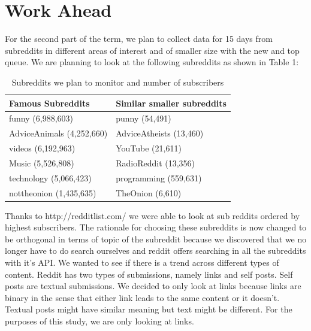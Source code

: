\documentclass{article} %
\begin{document}
\iffalse
\section{Work Ahead}
For the second part of the term, we plan to collect data for 15 days from subreddits in different areas of interest and of smaller size with the new and top queue. We are planning to look at the following subreddits as shown in Table 1:

\begin{table}
\begin{center}
    \begin{tabular}{ | l | l | }
    \hline
    Famous Subreddits & Similar smaller subreddits \\ \hline
    funny (6,988,603) & punny (54,491) \\ \hline
    AdviceAnimals (4,252,660) & AdviceAtheists (13,460) \\ \hline
    videos (6,192,963) & YouTube (21,611) \\ \hline
    Music (5,526,808) & RadioReddit (13,356) \\ \hline
    technology (5,066,423) & programming (559,631) \\ \hline
    nottheonion (1,435,635) & TheOnion (6,610) \\ 
    \hline
    \end{tabular}
    \caption{Subreddits we plan to monitor and number of subscribers}
    \end{center}
\end{table}


Thanks to http://redditlist.com/ we were able to look at sub reddits ordered by highest subscribers. The rationale for choosing these subreddits is now changed to be orthogonal in terms of topic of the subreddit because we discovered that we no longer have to do search ourselves and reddit offers searching in all the subreddits with it's API. We wanted to see if there is a trend across different types of content. Reddit has two types of submissions, namely links and self posts. Self posts are textual submissions. We decided to only look at links because links are binary in the sense that either link leads to the same content or it doesn't. Textual posts might have similar meaning but text might be different. For the purposes of this study, we are only looking at links. 
\end{document}
